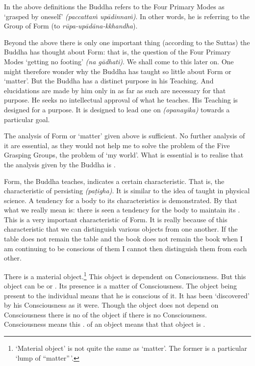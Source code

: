 In the above definitions the Buddha refers to the Four Primary Modes as `grasped by oneself' \emph{(paccattaṁ upādinnaṁ)}. In other words, he is referring to the  Group of Form (to \emph{rūpa-upādāna-kkhandha}).

Beyond the above there is only one important thing (according to the Suttas) the Buddha has thought about Form: that is, the question of the Four Primary Modes `getting no footing' \emph{(na gādhati)}. We shall come to this later on. One might therefore wonder why the Buddha has taught so little about Form or `matter'. But the Buddha has a distinct purpose in his Teaching. And elucidations are made by him only in as far as such are necessary for that purpose. He seeks no intellectual approval of what he teaches. His Teaching is designed for a purpose. It is designed to lead one on \emph{(opanayika)} towards a particular goal.

The analysis of Form or `matter' given above is sufficient. No further analysis of it are essential, as they would not help me to solve the problem of the Five Grasping Groups, the problem of `my world'. What is essential is to realise that the analysis given by the Buddha is .

Form, the Buddha teaches, indicates a certain characteristic. That is, the characteristic of persisting \emph{(paṭigha)}. It is similar to the idea of  taught in physical science. A tendency for a body to  its characteristics is demonstrated. By that what we really mean is: there is seen a tendency for the body to maintain its . This is a very important characteristic of Form. It is really because of this characteristic that we can distinguish various objects from one another. If the table does not remain the table and the book does not remain the book when I am continuing to be conscious of them I cannot then distinguish them from each other.

There is a material object.\footnote{`Material object' is not quite the same as `matter'. The former is a particular `lump of ``matter''\,'.} This object is  dependent on Consciousness. But this object can be  or . Its presence is a matter of Consciousness. The object being present to the individual means that he is conscious of it. It has been `discovered' by his Consciousness as it were. Though the object does not depend on Consciousness there is no  of the object if there is no Consciousness. Consciousness means this .  of an object means that that object is .

